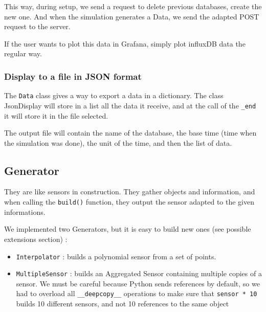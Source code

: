 This way, during setup, we send a request to delete previous databases, create
the new one. And when the simulation generates a Data, we send the adapted POST
request to the server.

If the user wants to plot this data in Grafana, simply plot influxDB data the
regular way.

\subsubsection{Display to a file in JSON format}

The \verb!Data! class gives a way to export a data in a dictionary. The class JsonDisplay will store in a list all the data it receive, and at the call of the \verb!_end! it will store it in the file selected.

The output file will contain the name of the database, the base time (time when the simulation was done), the unit of the time, and then the list of data.


\subsection{Generator}

They are like sensors in construction. They gather objects and information, and
when calling the \verb!build()! function, they output the sensor adapted to the
given informations.

We implemented two Generators, but it is easy to build new ones (see possible
extensions section) :
\begin{itemize}
    \item \verb!Interpolator! : builds a polynomial sensor from a set of points.
    \item \verb!MultipleSensor! : builds an Aggregated Sensor containing
multiple copies of a sensor. We must be careful because Python sends references
by default, so we had to overload all \verb!__deepcopy__! operations to make
sure that \verb!sensor * 10! builds 10 different sensors, and not 10 references
to the same object
\end{itemize}
